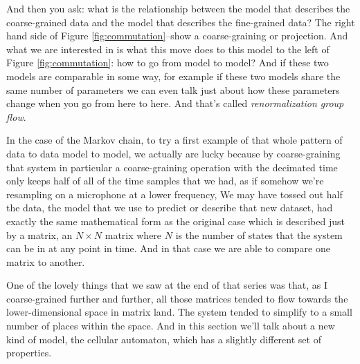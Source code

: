 \documentclass[]{article}
\begin{document}
And then you ask: what is the relationship between the model that describes the coarse-grained data and the model that describes the fine-grained data?
The right hand side of Figure \ref{fig:commutation}--show a coarse-graining or projection.
And what we are interested in is what this move does to this model to the left of Figure \ref{fig:commutation}: how to go from model to model? And if these two models
are comparable in some way, for example if these two models share the same number of parameters we can even talk just about how these parameters change when you go from here to here. And that's called \emph{renormalization group flow}.

In the case of the Markov chain, to try a first example of that whole pattern of data
to data model to model, we actually are lucky because by coarse-graining that system in particular a coarse-graining operation with the decimated time only keeps half of all of the time samples that we had, as if somehow we're resampling on a microphone at a lower frequency, We may have tossed out half the data, the model that we use to predict or describe that new dataset, had exactly the same mathematical form as the original case which is described just by a matrix, an $N \times N$ matrix
where $N$ is the number of states that the system can be in at any point in time.
And in that case we are able to compare one matrix to another.

One of the lovely things that we saw at the end of that
series was that, as I coarse-grained further and further, all those matrices tended to flow towards the lower-dimensional space in matrix land.
The system tended to simplify to a small number of places within the space.
And in this section we'll talk about a new kind of model, the cellular automaton, which has a slightly different set of properties. 
\end{document}
